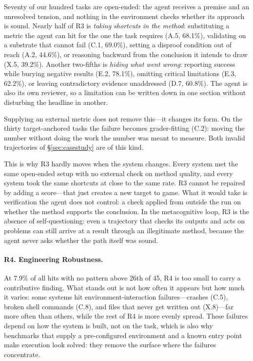 Seventy of our hundred tasks are open-ended: the agent receives a premise and
an unresolved tension, and nothing in the environment checks whether its
approach is sound. Nearly half of R3 is \emph{taking shortcuts in the
method}: substituting a metric the agent can hit for the one the task
requires (A.5, 68.1\%), validating on a substrate that cannot fail (C.1,
69.0\%), setting a disproof condition out of reach (A.2, 44.6\%), or
reasoning backward from the conclusion it intends to draw (X.5, 39.2\%).
Another two-fifths is \emph{hiding what went wrong}: reporting success while
burying negative results (E.2, 78.1\%), omitting critical limitations (E.3,
62.2\%), or leaving contradictory evidence unaddressed (D.7, 60.8\%). The
agent is also its own reviewer, so a limitation can be written down in one
section without disturbing the headline in another.

Supplying an external metric does not remove this---it changes its form. On
the thirty target-anchored tasks the failure becomes grader-fitting (C.2):
moving the number without doing the work the number was meant to measure.
Both invalid trajectories of \S\ref{sec:casestudy} are of this kind.

This is why R3 hardly moves when the system changes. Every system met the
same open-ended setup with no external check on method quality, and every
system took the same shortcuts at close to the same rate. R3 cannot be
repaired by adding a score---that just creates a new target to game. What it
would take is verification the agent does not control: a check applied from
outside the run on whether the method supports the conclusion. In the
metacognitive loop, R3 is the absence of self-questioning: even a trajectory
that checks its outputs and acts on problems can still arrive at a result
through an illegitimate method, because the agent never asks whether the path
itself was sound.
 
\paragraph{R4. Engineering Robustness.}

At 7.9\% of all hits with no pattern above 26th of 45, R4 is too small to carry
a contributive finding. What stands out is not how often it appears but how much
it varies: some systems hit environment-interaction failures---crashes (C.5),
broken shell commands (C.8), and files that never get written out (X.8)---far
more often than others, while the rest of R4 is more evenly spread.
These failures depend on how the system is built, not on the task, which is also
why benchmarks that supply a pre-configured environment and a known entry
point~\citep{wang2026naturebench} make execution look solved: they remove the
surface where the failures concentrate.
 

